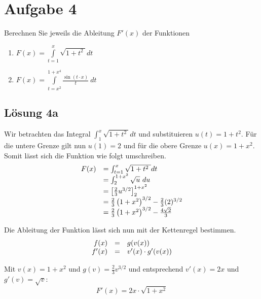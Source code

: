\documentclass[main.tex]{subfiles}
\begin{document}
\section{Aufgabe 4}

Berechnen Sie jeweils die Ableitung $F'( x)$ der Funktionen

\begin{enumerate}
    \item $F( x) =\int\limits _{t=1}^{x}\sqrt{1+t^{2} \ } dt$
    \item $F( x) =\int\limits _{t=x^{2}}^{1+x^{4}}\frac{\sin( t\cdotp x)}{t} \ dt$
\end{enumerate}

\subsection{Lösung 4a}
Wir betrachten das Integral $\int\nolimits _{1}^{x}\sqrt{1+t^{2} \ } dt$ und substituieren $u( t) =1+t^{2}$. Für die untere Grenze gilt nun $u( 1) =2$ und für die obere Grenze $u( x) =1+x^{2}$. Somit lässt sich die Funktion wie folgt umschreiben.
\begin{equation*}
    \begin{array}{ c l }
        F( x) & =\int\nolimits _{t=1}^{x}\sqrt{1+t^{2} \ } dt\\
        & =\int\nolimits _{2}^{1+x^{2}}\sqrt{u} \ du\\
        & =\left[\frac{2}{3} u^{3/2}\right]_{2}^{1+x^{2}}\\
        & =\frac{2}{3}\left( 1+x^{2}\right)^{3/2} -\frac{2}{3}( 2)^{3/2}\\
        & =\frac{2}{3}\left( 1+x^{2}\right)^{3/2} -\frac{4\sqrt{2}}{3}
    \end{array}
\end{equation*}

Die Ableitung der Funktion lässt sich nun mit der Kettenregel bestimmen.
\begin{equation*}
    \begin{array}{ r c l }
        f( x) & = & g( v( x))\\
        f'( x) & = & v'( x) \cdotp g'( v( x))
    \end{array}
\end{equation*}

Mit $v( x) =1+x^{2}$ und $g( v) =\frac{2}{3} v^{3/2}$ und entsprechend $v'( x) =2x$ und $g'( v) =\sqrt{v}$:
\begin{equation*}
    F'( x) =2x\cdotp \sqrt{1+x^{2}}
\end{equation*}
\end{document}

